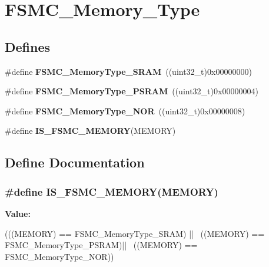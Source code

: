 \hypertarget{group__FSMC__Memory__Type}{
\section{FSMC\_\-Memory\_\-Type}
\label{group__FSMC__Memory__Type}
}
\subsection*{Defines}
\begin{DoxyCompactItemize}
\item 
\hypertarget{group__FSMC__Memory__Type_ga8a24e8da42e67dcf6fb2f43659aa49cf}{
\#define {\bfseries FSMC\_\-MemoryType\_\-SRAM}~((uint32\_\-t)0x00000000)}
\label{group__FSMC__Memory__Type_ga8a24e8da42e67dcf6fb2f43659aa49cf}

\item 
\hypertarget{group__FSMC__Memory__Type_gae3e680998b2fee8d56222634f5268a75}{
\#define {\bfseries FSMC\_\-MemoryType\_\-PSRAM}~((uint32\_\-t)0x00000004)}
\label{group__FSMC__Memory__Type_gae3e680998b2fee8d56222634f5268a75}

\item 
\hypertarget{group__FSMC__Memory__Type_ga8b9390abe7c281947c550bf4365649e5}{
\#define {\bfseries FSMC\_\-MemoryType\_\-NOR}~((uint32\_\-t)0x00000008)}
\label{group__FSMC__Memory__Type_ga8b9390abe7c281947c550bf4365649e5}

\item 
\#define {\bfseries IS\_\-FSMC\_\-MEMORY}(MEMORY)
\end{DoxyCompactItemize}


\subsection{Define Documentation}
\hypertarget{group__FSMC__Memory__Type_ga255cd500e141f4ac024cf5f896921233}{
\subsubsection[{IS\_\-FSMC\_\-MEMORY}]{\setlength{\rightskip}{0pt plus 5cm}\#define IS\_\-FSMC\_\-MEMORY(MEMORY)}}
\label{group__FSMC__Memory__Type_ga255cd500e141f4ac024cf5f896921233}
{\bfseries Value:}
\begin{DoxyCode}
(((MEMORY) == FSMC_MemoryType_SRAM) || \
                                ((MEMORY) == FSMC_MemoryType_PSRAM)|| \
                                ((MEMORY) == FSMC_MemoryType_NOR))
\end{DoxyCode}
